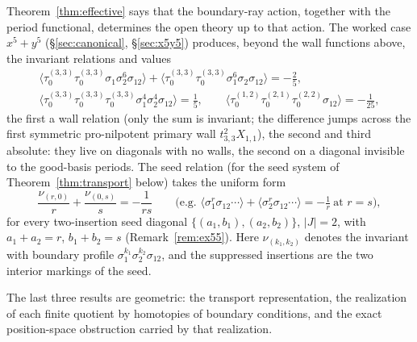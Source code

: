 \documentclass[11pt]{amsart}
\theoremstyle{definition}
\theoremstyle{remark}
\begin{document}
Theorem~\ref{thm:effective} says that the boundary-ray action, together with
the period functional, determines the open theory up to that action. The worked case
$x^{5}+y^{5}$ (\S\ref{sec:canonical}, \S\ref{sec:x5y5}) produces, beyond the wall
functions above, the invariant relations and values
\begin{gather}
\langle\tau_{0}^{(3,3)}\tau_{0}^{(3,3)}\sigma_{1}\sigma_{2}^{6}\sigma_{12}\rangle
+\langle\tau_{0}^{(3,3)}\tau_{0}^{(3,3)}\sigma_{1}^{6}\sigma_{2}\sigma_{12}\rangle
=-\tfrac25,
\label{eq:firstwallrel}\\
\langle\tau_{0}^{(3,3)}\tau_{0}^{(3,3)}\tau_{0}^{(3,3)}
\sigma_{1}^{4}\sigma_{2}^{4}\sigma_{12}\rangle=\tfrac15,\qquad
\langle\tau_{0}^{(1,2)}\tau_{0}^{(2,1)}\tau_{0}^{(2,2)}\sigma_{12}\rangle
=-\tfrac1{25},
\label{eq:newinvariants}
\end{gather}
the first a wall relation (only the sum is invariant; the difference jumps across
the first symmetric pro-nilpotent primary wall $t_{3,3}^{2}X_{1,1}$), the
second and third absolute: they live on diagonals with no walls, the second on a
diagonal invisible to the good-basis periods. The seed relation (for the seed system of Theorem~\ref{thm:transport} below)
takes the uniform form
\begin{equation}
\label{eq:seed}
\frac{\nu_{(r,0)}}{r}+\frac{\nu_{(0,s)}}{s}=-\frac1{rs}
\qquad\text{(e.g. }\langle\sigma_{1}^{r}\sigma_{12}\cdots\rangle
+\langle\sigma_{2}^{r}\sigma_{12}\cdots\rangle=-\tfrac1r\ \text{at }r=s),
\end{equation}
for every two-insertion seed diagonal $\{(a_{1},b_{1}),(a_{2},b_{2})\}$,
$|J|=2$, with $a_{1}+a_{2}=r$, $b_{1}+b_{2}=s$ (Remark~\ref{rem:ex55}). Here
$\nu_{(k_{1},k_{2})}$ denotes the invariant with boundary profile
$\sigma_{1}^{k_{1}}\sigma_{2}^{k_{2}}\sigma_{12}$, and the suppressed
insertions are the two interior markings of the seed.

The last three results are geometric: the transport representation, the
realization of each finite quotient by homotopies of boundary
conditions, and the exact position-space obstruction carried by that
realization.
\end{document}
